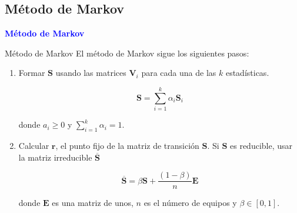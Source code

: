 \documentclass[10pt,hyperref={unicode}]{beamer}
\begin{document}
	
	\subsection*{Método de Markov}
	
	\begin{frame}
		\begin{center}
			\Huge\textbf{\textsf{\textcolor{blue}{Método de Markov}}}
		\end{center}
	\end{frame}
	
	\begin{frame}{Método de Markov}
		El método de Markov sigue los siguientes pasos:
		
		\begin{enumerate}
			\item Formar $\mathbf{S}$ usando las matrices $\mathbf{V}_i$ para cada una de las $k$ estadísticas.
			
			\[ \mathbf{S} = \sum_{i=1}^{k} \alpha_i \mathbf{S}_i \]
			
			donde $a_i \geq 0$ y $\sum_{i=1}^{k} \alpha_i = 1$.
			
			\item Calcular $\mathbf{r}$, el punto fijo de la matriz de transición $\mathbf{S}$. Si $\mathbf{S}$ es reducible, usar la matriz irreducible $\overline{\mathbf{S}}$
			
			\[\overline{\mathbf{S}} = \beta \mathbf{S} + \dfrac{(1 - \beta)}{n} \mathbf{E}\]
			
			donde $\mathbf{E}$ es una matriz de unos, $n$ es el número de equipos y $\beta \in [0, 1]$.
		\end{enumerate}
	\end{frame}
	
			
	
\end{document}
